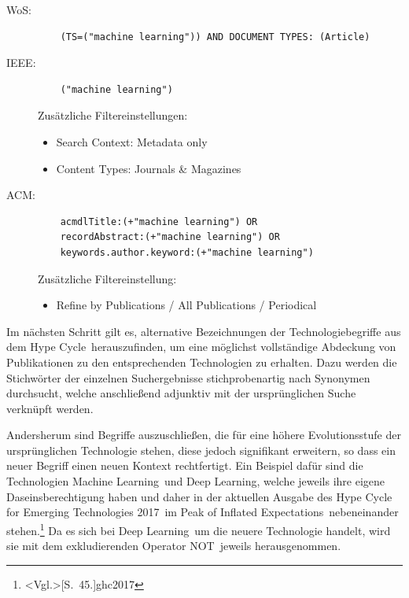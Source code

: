 \begin{description}
	\item [WoS:] \begin{verbatim}
	(TS=("machine learning")) AND DOCUMENT TYPES: (Article)
	\end{verbatim}

	\item [IEEE:] \begin{verbatim}
	("machine learning")
	\end{verbatim}
	Zusätzliche Filtereinstellungen:
	\begin{itemize}
		\item Search Context: Metadata only
		\item Content Types: Journals \& Magazines
	\end{itemize}

	\item [ACM:] \begin{verbatim}
	acmdlTitle:(+"machine learning") OR
	recordAbstract:(+"machine learning") OR
	keywords.author.keyword:(+"machine learning")
	\end{verbatim}
	Zusätzliche Filtereinstellung:
	\begin{itemize}
		\item Refine by Publications / All Publications / Periodical
	\end{itemize}
\end{description}

Im nächsten Schritt gilt es, alternative Bezeichnungen der Technologiebegriffe aus dem \glqq Hype Cycle\grqq~herauszufinden, um eine möglichst vollständige Abdeckung von Publikationen zu den entsprechenden Technologien zu erhalten. Dazu werden die Stichwörter der einzelnen Suchergebnisse stichprobenartig nach Synonymen durchsucht, welche anschließend adjunktiv mit der ursprünglichen Suche verknüpft werden.

Andersherum sind Begriffe auszuschließen, die für eine höhere Evolutionsstufe der ursprünglichen Technologie stehen, diese jedoch signifikant erweitern, so dass ein neuer Begriff einen neuen Kontext rechtfertigt. Ein Beispiel dafür sind die Technologien \glqq Machine Learning\grqq~und \glqq Deep Learning\grqq, welche jeweils ihre eigene Daseinsberechtigung haben und daher in der aktuellen Ausgabe des \glqq Hype Cycle for Emerging Technologies 2017\grqq~im \glqq Peak of Inflated Expectations\grqq~nebeneinander stehen.\footnote{\citeNP<Vgl.>[S.~45.]{ghc2017}} Da es sich bei \glqq Deep Learning\grqq~um die neuere Technologie handelt, wird sie mit dem exkludierenden Operator \glqq NOT\grqq~jeweils herausgenommen.

